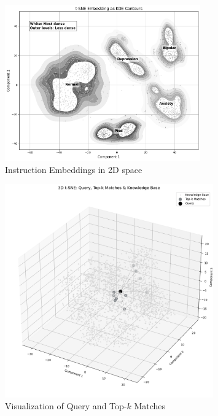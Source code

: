 \vspace{-0.7cm}

\begin{figure}[H]
    \centering
    \includegraphics[width=0.75\textwidth]{Images/RAG_WBEMBED.png}
    \vspace{-0.3cm}
    \caption*{Instruction Embeddings in 2D space}
    \label{fig:wellbeing_questions}
\end{figure}

\vspace{-2cm}

\pagebreak

\begin{figure}[H]
    \centering
    \includegraphics[width=0.8\textwidth]{Images/RAG_KNOWLEDGE.png}
    \vspace{-0.3cm}
    \caption*{Visualization of Query and Top-\(k\) Matches}
    \label{fig:wellbeing_questions}
\end{figure}



